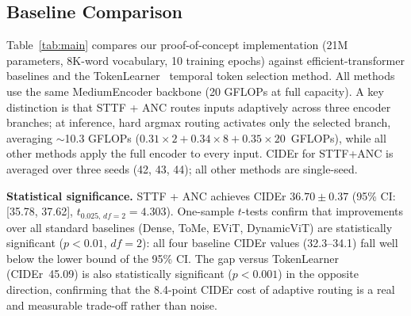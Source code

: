 \documentclass{article}
\begin{document}
\subsection{Baseline Comparison}

Table~\ref{tab:main} compares our proof-of-concept implementation (21M parameters, 8K-word vocabulary, 10 training epochs) against efficient-transformer baselines and the TokenLearner~\cite{ryoo2021tokenlearner} temporal token selection method.
All methods use the same MediumEncoder backbone (20 GFLOPs at full capacity).
A key distinction is that STTF + ANC routes inputs adaptively across three encoder branches; at inference, hard argmax routing activates only the selected branch, averaging $\sim$10.3 GFLOPs ($0.31{\times}2 + 0.34{\times}8 + 0.35{\times}20$~GFLOPs), while all other methods apply the full encoder to every input.
CIDEr for STTF+ANC is averaged over three seeds (42, 43, 44); all other methods are single-seed.

\textbf{Statistical significance.}
STTF + ANC achieves CIDEr $36.70 \pm 0.37$ (95\% CI: [35.78, 37.62], $t_{0.025,\,df=2}{=}4.303$).
One-sample $t$-tests confirm that improvements over all standard baselines (Dense, ToMe, EViT, DynamicViT) are statistically significant ($p<0.01$, $df=2$): all four baseline CIDEr values (32.3--34.1) fall well below the lower bound of the 95\% CI.
The gap versus TokenLearner (CIDEr~45.09) is also statistically significant ($p<0.001$) in the opposite direction, confirming that the 8.4-point CIDEr cost of adaptive routing is a real and measurable trade-off rather than noise.
\end{document}
